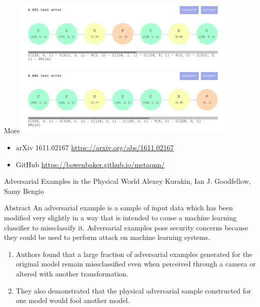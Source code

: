 \documentclass[15pt]{beamer}
\begin{document}
\begin{frame}{More}
  \centering
  \includegraphics[width=0.8\textwidth]{bowen.png}

  \begin{itemize}
  \item arXiv 1611.02167 \url{https://arxiv.org/abs/1611.02167}
  \item GitHub \url{https://bowenbaker.github.io/metaqnn/}
  \end{itemize}
\end{frame}



\begin{frame}{Adversarial Examples in the Physical World}
  Alexey Kurakin, Ian J. Goodfellow, Samy Bengio

  \vspace{0.1in}

  \begin{block}{Abstract}
  An adversarial example is a sample of input data which has been modified very slightly in a way that is intended to cause a machine learning classifier to missclassify it. Adversarial examples pose security concerns because they could be used to perform attack on machine learning systems.
  \vskip0.1in
  \begin{enumerate}
  \item Authors found that a large fraction of adversarial examples generated for the original model remain missclassified even when perceived through a camera or altered with another transformation.
  \item They also demonstrated that the physical adversarial sample constructed for one model would fool another model.
  \end{enumerate}
  
  \end{block}
\end{frame}
\end{document}
